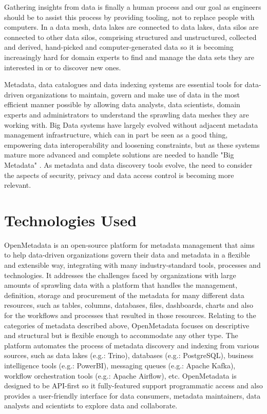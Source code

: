 Gathering insights from data is finally a human process and our goal as engineers should be to assist this process by providing tooling, not to replace people with computers. In a data mesh, data lakes are connected to data lakes, data silos are connected to other data silos, comprising structured and unstructured, collected and derived, hand-picked and computer-generated data so it is becoming increasingly hard for domain experts to find and manage the data sets they are interested in or to discover new ones.

Metadata, data catalogues and data indexing systems are essential tools for data-driven organizations to maintain, govern and make use of data in the most efficient manner possible by allowing data analysts, data scientists, domain experts and administrators to understand the sprawling data meshes they are working with. Big Data systems have largely evolved without adjacent metadata management infrastructure, which can in part be seen as a good thing, empowering data interoperability and loosening constraints, but as these systems mature more advanced and complete solutions are needed to handle "Big Metadata" \cite{bigMetadataSmith2014}. As metadata and data discovery tools evolve, the need to consider the aspects of security, privacy and data access control is becoming more relevant.

\section{Technologies Used}

OpenMetadata is an open-source platform for metadata management that aims to help data-driven organizations govern their data and metadata in a flexible and extensible way, integrating with many industry-standard tools, processes and technologies. It addresses the challenges faced by organizations with large amounts of sprawling data with a platform that handles the management, definition, storage and procurement of the metadata for many different data resources, such as tables, columns, databases, files, dashboards, charts and also for the workflows and processes that resulted in those resources. Relating to the categories of metadata described above, OpenMetadata focuses on descriptive and structural but is flexible enough to accommodate any other type. The platform automates the process of metadata discovery and indexing from various sources, such as data lakes (e.g.: Trino), databases (e.g.: PostgreSQL), business intelligence tools (e.g.: PowerBI), messaging queues (e.g.: Apache Kafka), workflow orchestration tools (e.g.: Apache Airflow), etc. OpenMetadata is designed to be API-first \cite{apiFirstBealieu} so it fully-featured support programmatic access and also provides a user-friendly interface for data consumers, metadata maintainers, data analysts and scientists to explore data and collaborate.

